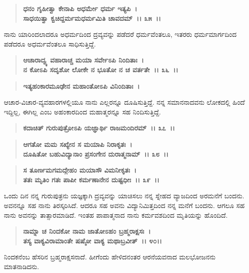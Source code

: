 \begin{verse}
\textbf{ಧನಂ ಗೃಹೀತ್ವಾ ಕೇನಾಪಿ ಅಧರ್ಮೇ ಧರ್ಮ ಇತ್ಯಪಿ~।}\\\textbf{ಸಾಧಯಿತ್ವಾ ಕ್ವಚಿದ್ದರ್ಮಮಧರ್ಮಮಿತಿ ಚಾವದಮ್~।। ೩೫~।।}
\end{verse}

ನಾನು ಯಾರಿಂದಲಾದರೂ ಅಧರ್ಮದಿಂದ ದ್ರವ್ಯವನ್ನು ಪಡೆದರೆ ಧರ್ಮವೆಂತಲೂ, ಇತರರು ಧರ್ಮಮಾರ್ಗದಿಂದ ಪಡೆದರೂ ಅಧರ್ಮವೆಂತಲೂ ಸಾಧಿಸುತ್ತಿದ್ದೆ.

\begin{verse}
\textbf{ಆಚಾರಾದ್ವ್ಯ ವಹಾರಾಚ್ಚ ಮಯಾ ಸರ್ವೇಽಪಿ ನಿಂದಿತಾಃ~।}\\\textbf{ನ ಕೋಽಪಿ ಸದೃಶೋ ಲೋಕೇ ನ ಭೂತೋ ನ ಚ ವರ್ತತೇ~।। ೩೬~।।}
\end{verse}

\begin{verse}
\textbf{ಇತ್ಯಹಂಕಾರಮೂಢೇನ ಮಹಾಂತೋಽಪಿ ವಿನಿಂದಿತಾಃ~।}
\end{verse}

ಆಚಾರ-ವಿಚಾರ-ವ್ಯವಹಾರಗಳಲ್ಲಿಯೂ ನಾನು ಎಲ್ಲರನ್ನೂ ದೂಷಿಸುತ್ತಿದ್ದೆ. ನನ್ನ ಸಮಾನನಾದವನು ಲೋಕದಲ್ಲಿ ಹಿಂದೆ ಇದ್ದಿಲ್ಲ, ಈಗಿಲ್ಲ ಎಂಬ ಅಹಂಕಾರದಿಂದ ಮಹಾತ್ಮರನ್ನೂ ಸಹ ನಿಂದಿಸುತ್ತಿದ್ದೆ.

\begin{verse}
\textbf{ಕದಾಚಿತ್ ಗುರುಪುತ್ರೋಽಪಿ ಯಜ್ಞಾರ್ಥಿ ರಾಜಮಂದಿರಮ್~।। ೩೭~।।} 
\end{verse}

\begin{verse}
\textbf{ಆಗತೋ ಮಮ ಸಖ್ಯೇನ ಸ ಮಯಾಪಿ ನಿರಾಕೃತಃ~।}\\\textbf{ದೂಷಿತೋ ಬಹುವಿದ್ಯಾನಾಂ ಪ್ರಸಂಗೇನ ದುರಾತ್ಮನಾಮ್~।। ೩೮~।। }
\end{verse}

\begin{verse}
\textbf{ಸ ತೂರ್ಣಮಗಮದ್ಗೇಹಂ ಮಯಾಸೌ ವಿಮನೀಕೃತಃ~।}\\\textbf{ತತಃ ಮೃತಿಂ ಗತಃ ಪಾಪೀ ಕರ್ಮಣಾನೇನ ದುಷ್ಟಧೀಃ~।। ೩೯~।।}
\end{verse}

ಒಂದು ದಿನ ನನ್ನ ಗುರುಪುತ್ರನು ಯಜ್ಞಕ್ಕಾಗಿ ದ್ರವ್ಯವನ್ನು ಯಾಚಿಸಲು ನನ್ನ ಸ್ನೇಹದ ವ್ಯಾಜದಿಂದ ಅರಮನೆಗೆ ಬಂದನು. ಅವನನ್ನೂ ಸಹ ನಾನು ತಿರಸ್ಕರಿಸಿದೆ. ಆದರೂ ಸಹ ಅವನು ವಿದ್ಯಾನಿಮಿತ್ತದಿಂದ ನನ್ನ ಮನೆಗೆ ಬಂದನು. ಆಗಲೂ ಸಹ ನಾನು ಅವನನ್ನು ತಾತ್ಸಾರಮಾಡಿದೆ. ಇಂತಹ ಪಾಪಾತ್ಮನಾದ ನಾನು ಕರ್ಮವಶದಿಂದ ಮೃತಿಯನ್ನು ಹೊಂದಿದೆ.

\begin{verse}
\textbf{ನಾಮ್ನಾ ಚ ನಿಂದಕೋ ನಾಮ ಜಾತೋಽಹಂ ಬ್ರಹ್ಮರಾಕ್ಷಸಃ~।}\\\textbf{ತಸ್ಯ ವಾಕ್ಯವಿರಾಮಾಂತೇ ಷಷ್ಠೋ ವಾಕ್ಯ ಮಥಾಬ್ರವೀತ್~।। ೪೦।।}
\end{verse}

ನಿಂದಕನೆಂಬ ಹೆಸರಿನ ಬ್ರಹ್ಮರಾಕ್ಷಸನಾದೆ. ಹೀಗೆಂದು ಹೇಳಿದನಂತರ ಆರನೆಯವನಾದ ಮಲಭೋಜನನು ಮಾತನಾಡಿದನು.

